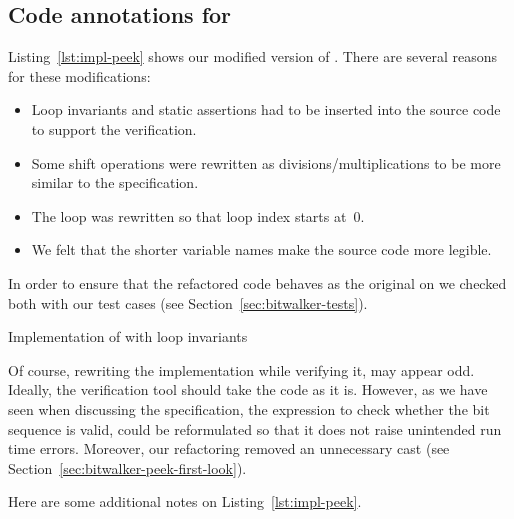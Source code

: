 \clearpage

\subsection{Code annotations for \peek}
\label{sec:peek-loop-invariants}

Listing~\ref{lst:impl-peek} shows our modified version of \peek.
There are several reasons for these modifications:

\begin{itemize}
\item Loop invariants and static assertions had to be inserted into
      the source code to support the verification.
\item Some shift operations were rewritten as divisions\slash multiplications
      to be more similar to the specification.
\item The loop was rewritten so that loop index starts at~0.
\item We felt that the shorter variable names make the source code more legible.
\end{itemize}

In order to ensure that the refactored code behaves as the original
on we checked both with our test cases (see Section~\ref{sec:bitwalker-tests}).

\begin{listing}[hbt]
\begin{minipage}{\textwidth}

\end{minipage}
\caption{\label{lst:impl-peek} Implementation of \peek with \acsl loop invariants}
\end{listing}

\clearpage

Of course, rewriting the implementation while verifying it, may appear odd.
Ideally, the verification tool should take the code as it is.
However, as we have seen when discussing the specification, the
expression to check whether the bit sequence is valid,
could be reformulated so that it does not raise unintended run time errors.
Moreover, our refactoring removed an unnecessary cast (see 
Section~\ref{sec:bitwalker-peek-first-look}).

Here are some additional notes on Listing~\ref{lst:impl-peek}.

